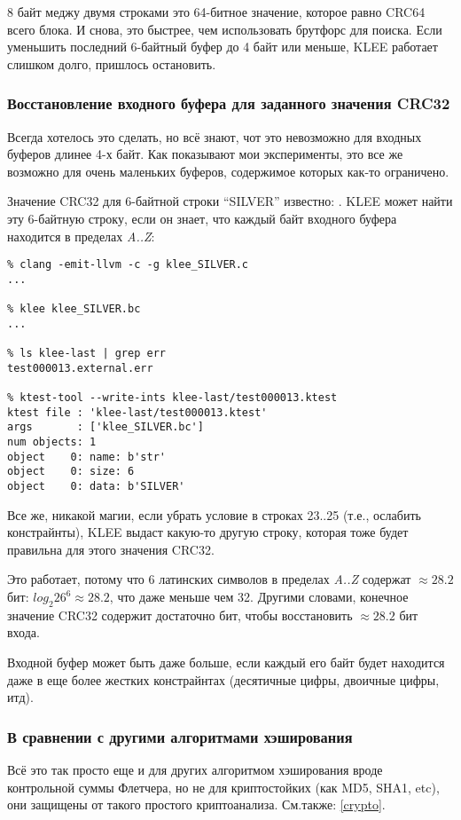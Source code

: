 8 байт меджу двумя строками это 64-битное значение, которое равно CRC64 всего блока.
И снова, это быстрее, чем использовать брутфорс для поиска.
Если уменьшить последний 6-байтный буфер до 4 байт или меньше, KLEE работает слишком долго, пришлось остановить.

\subsubsection{Восстановление входного буфера для заданного значения CRC32}

Всегда хотелось это сделать, но всё знают, чот это невозможно для входных буферов длинее 4-х байт.
Как показывают мои эксперименты, это все же возможно для очень маленьких буферов, содержимое которых как-то ограничено.

Значение CRC32 для 6-байтной строки ``SILVER'' известно: .
KLEE может найти эту 6-байтную строку, если он знает, что каждый байт входного буфера находится в пределах \textit{A..Z}:



\begin{lstlisting}
% clang -emit-llvm -c -g klee_SILVER.c
...

% klee klee_SILVER.bc
...

% ls klee-last | grep err
test000013.external.err

% ktest-tool --write-ints klee-last/test000013.ktest
ktest file : 'klee-last/test000013.ktest'
args       : ['klee_SILVER.bc']
num objects: 1
object    0: name: b'str'
object    0: size: 6
object    0: data: b'SILVER'
\end{lstlisting}

Все же, никакой магии, если убрать условие в строках 23..25 (т.е., ослабить констрайнты),
KLEE выдаст какую-то другую строку, которая тоже будет правильна для этого значения CRC32.

Это работает, потому что 6 латинских символов в пределах \textit{A..Z} содержат $\approx 28.2$ бит:
$log_2{26^6} \approx 28.2$, что даже меньше чем 32.
Другими словами, конечное значение CRC32 содержит достаточно бит, чтобы восстановить $\approx 28.2$ бит входа.

Входной буфер может быть даже больше, если каждый его байт будет находится даже в еще более
жестких констрайнтах (десятичные цифры, двоичные цифры, итд).

\subsubsection{В сравнении с другими алгоритмами хэширования}

Всё это так просто еще и для других алгоритмом хэширования вроде контрольной суммы Флетчера,
но не для криптостойких (как MD5, SHA1, etc), они защищены от такого простого криптоанализа.
См.также: \ref{crypto}.

